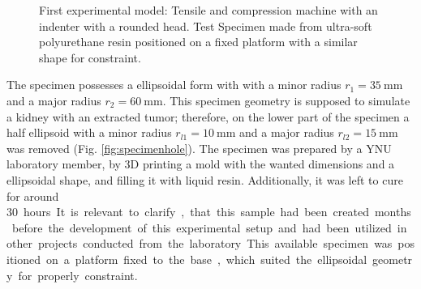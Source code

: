 \begin{figure}%
    \centering
   \qquad
   \caption{First experimental model: Tensile and compression machine with an indenter with a rounded head. Test Specimen made from ultra-soft polyurethane resin positioned on a fixed platform with a similar shape for constraint.}%
   \label{fig:firstexperiment}%
\end{figure}

The specimen possesses a ellipsoidal form with 
with a minor radius $r_1 = \SI{35}{\milli \m}$ and a major radius $r_2 = \SI{60}{\milli \m}$. 
This specimen geometry is supposed to simulate a kidney with an extracted tumor; therefore,
on the lower part of the specimen a half ellipsoid with a minor radius $r_{l1} = \SI{10}{\milli \m}$ 
and a major radius $r_{l2} = \SI{15}{\milli \m}$ was removed (Fig. \ref{fig:specimenhole}). 
The specimen was prepared by a YNU laboratory member, by 3D printing a mold with the wanted dimensions
 and a ellipsoidal shape, and filling it with liquid resin. 
 Additionally, it was left to cure for around \SI{30} hours. It is relevant to clarify, that this 
 sample had been created months before the development of this experimental setup and 
 had been utilized in other projects conducted from the laboratory.
This available specimen was positioned on a platform fixed to the base, which suited 
the ellipsoidal geometry for properly constraint. 

